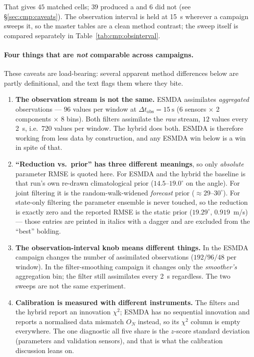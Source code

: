 That gives $45$ matched cells; $39$ produced a  and $6$
did not (see \S\ref{sec:cmp:caveats}). The observation interval is held at
\SI{15}{\second} wherever a campaign sweeps it, so the master tables are a
clean method contrast; the sweep itself is compared separately in
Table~\ref{tab:cmp:obsinterval}.

\paragraph{Four things that are \emph{not} comparable across campaigns.}
These caveats are load-bearing: several apparent method differences below are
partly definitional, and the text flags them where they bite.

\begin{enumerate}[nosep,leftmargin=1.6em]
  \item \textbf{The observation stream is not the same.} ESMDA assimilates
        \emph{aggregated} observations --- $96$ values per window at
        $\Delta t_{\mathrm{obs}} = \SI{15}{\second}$ (6 sensors $\times$ 2
        components $\times$ 8 bins). Both filters assimilate the \emph{raw}
        stream, $12$ values every \SI{2}{\second}, i.e.\ $720$ values per
        window. The hybrid does both. ESMDA is therefore working from less
        data by construction, and any ESMDA win below is a win in spite of
        that.
  \item \textbf{``Reduction vs.\ prior'' has three different meanings}, so
        only \emph{absolute} parameter RMSE is quoted here. For ESMDA and the
        hybrid the baseline is that run's own re-drawn climatological prior
        ($14.5$--$19.0^\circ$ on the angle). For joint filtering it is the
        random-walk-widened \emph{forecast} prior ($\approx 29$--$30^\circ$).
        For state-only filtering the parameter ensemble is never touched, so
        the reduction is exactly zero and the reported RMSE is the static
        prior ($19.29^\circ$, $0.919$~m/s) --- those entries are printed in
        italics with a dagger and are excluded from the ``best'' bolding.
  \item \textbf{The observation-interval knob means different things.} In the
        ESMDA campaign  changes the number of assimilated
        observations ($192/96/48$ per window). In the filter-smoothing
        campaign it changes only the \emph{smoother's} aggregation bin; the
        filter still assimilates every \SI{2}{\second} regardless. The two
        sweeps are not the same experiment.
  \item \textbf{Calibration is measured with different instruments.} The
        filters and the hybrid report an innovation $\chi^2$; ESMDA has no
        sequential innovation and reports a normalised data mismatch $O_N$
        instead, so its $\chi^2$ column is empty everywhere. The one
        diagnostic all five share is the $z$-score standard deviation
        (parameters and validation sensors), and that is what the calibration
        discussion leans on.
\end{enumerate}


